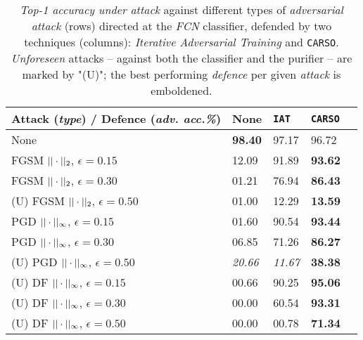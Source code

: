 \begin{table}[hbt]
    \centering
    \begin{tabular}{@{}lllll@{}}
    \toprule
    Attack (\textit{type}) / Defence (\textit{adv. acc.\%})      & None & \texttt{IAT} & \texttt{CARSO} &  \\
    \midrule
    None                   & \textbf{98.40}                & 97.17              & 96.72                &  \\
    \midrule
    FGSM $||\cdot||_2$, $\epsilon=0.15$         & 12.09                & 91.89              & \textbf{93.62}                &  \\
    FGSM $||\cdot||_2$, $\epsilon=0.30$         & 01.21                & 76.94              & \textbf{86.43}                &  \\
    \midrule
    (U) FGSM $||\cdot||_2$, $\epsilon=0.50$     & 01.00                & 12.29              & \textbf{13.59}                &  \\
    \midrule
    PGD $||\cdot||_{\infty}$, $\epsilon=0.15$     & 01.60                & 90.54              & \textbf{93.44}                &  \\
    PGD $||\cdot||_{\infty}$, $\epsilon=0.30$     & 06.85                & 71.26              & \textbf{86.27}                &  \\
    \midrule
    (U) PGD $||\cdot||_{\infty}$, $\epsilon=0.50$ & \textit{20.66}                & \textit{11.67}              & \textbf{38.38}                &  \\
    \midrule
    (U) DF $||\cdot||_{\infty}$, $\epsilon=0.15$  & 00.66                & 90.25              & \textbf{95.06}               &  \\
    (U) DF $||\cdot||_{\infty}$, $\epsilon=0.30$  & 00.00                & 60.54              & \textbf{93.31}                &  \\
    (U) DF $||\cdot||_{\infty}$, $\epsilon=0.50$  & 00.00                & 00.78              & \textbf{71.34}                &  \\ \bottomrule
\end{tabular}
    \caption{
        \textit{Top-1 accuracy under attack} against different types of \textit{adversarial attack} (rows) directed at the \textit{FCN} classifier, defended by two techniques (columns): \textit{Iterative Adversarial Training} and \texttt{CARSO}. \textit{Unforeseen} attacks -- against both the classifier and the purifier -- are marked by "(U)"; the best performing \textit{defence} per given \textit{attack} is emboldened.
    }
\label{table:results}
\end{table}

